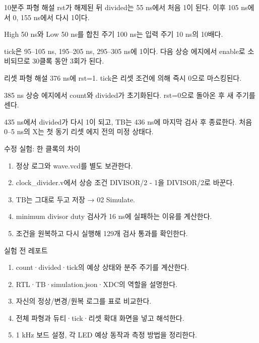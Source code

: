 \begin{frame}{10분주 파형 해설}
\small
rst가 해제된 뒤 divided는 55 ns에서 처음 1이 된다. 이후 105 ns에서 0, 155 ns에서 다시 1이다.\par\vspace{0.26cm}High 50 ns와 Low 50 ns를 합친 주기 100 ns는 입력 주기 10 ns의 10배다.\par\vspace{0.26cm}tick은 95–105 ns, 195–205 ns, 295–305 ns에 1이다. 다음 상승 에지에서 enable로 소비되므로 30클록 동안 3회가 된다.\par
\end{frame}

\begin{frame}{리셋 파형 해설}
\small
376 ns에 rst=1. tick은 리셋 조건에 의해 즉시 0으로 마스킹된다.\par\vspace{0.26cm}385 ns 상승 에지에서 count와 divided가 초기화된다. rst=0으로 돌아온 후 새 주기를 센다.\par\vspace{0.26cm}435 ns에서 divided가 다시 1이 되고, TB는 436 ns에 마지막 검사 후 종료한다. 처음 0–5 ns의 X는 첫 동기 리셋 에지 전의 미정 상태다.\par
\end{frame}

\begin{frame}{수정 실험: 한 클록의 차이}
\small
\begin{enumerate}
\item 정상 로그와 wave.vcd를 별도 보관한다.
\item clock\_divider.v에서 상승 조건 DIVISOR/2 - 1을 DIVISOR/2로 바꾼다.
\item TB는 그대로 두고 저장 → 02 Simulate.
\item minimum divisor duty 검사가 16 ns에 실패하는 이유를 계산한다.
\item 조건을 원복하고 다시 실행해 129개 검사 통과를 확인한다.
\end{enumerate}
\end{frame}

\begin{frame}[label=reports]{실험 전 레포트}
\small
\begin{enumerate}
\item count·divided·tick의 예상 상태와 분주 주기를 계산한다.
\item RTL·TB·simulation.json·XDC의 역할을 설명한다.
\item 자신의 정상/변경/원복 로그를 표로 비교한다.
\item 전체 파형과 듀티·tick·리셋 확대 화면을 넣고 해석한다.
\item 1 kHz 보드 설정, 각 LED 예상 동작과 측정 방법을 정리한다.
\end{enumerate}
\end{frame}


